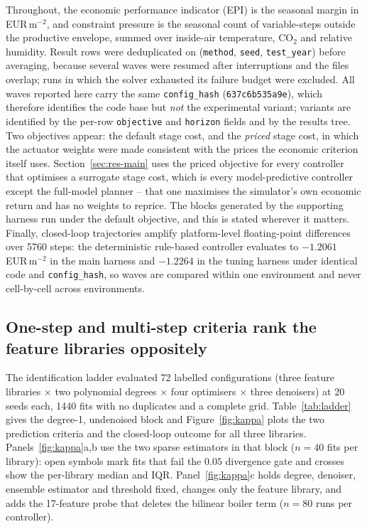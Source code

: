 Throughout, the economic performance indicator (EPI) is the seasonal margin in
EUR\,m$^{-2}$, and constraint pressure is the seasonal count of variable-steps outside the
productive envelope, summed over inside-air temperature, CO$_2$ and relative humidity. Result rows were deduplicated on
(\texttt{method}, \texttt{seed}, \texttt{test\_year}) before averaging, because several
waves were resumed after interruptions and the files overlap; runs in which the solver
exhausted its failure budget were excluded. All waves reported here carry the same
\texttt{config\_hash} (\texttt{637c6b535a9e}), which therefore identifies the code base but
\emph{not} the experimental variant; variants are identified by the per-row
\texttt{objective} and \texttt{horizon} fields and by the results tree. Two objectives
appear: the default stage cost, and the \emph{priced} stage cost, in which the actuator
weights were made consistent with the prices the economic criterion itself uses.
Section~\ref{sec:res-main} uses the priced objective for every controller that optimises a
surrogate stage cost, which is every model-predictive controller except the full-model
planner -- that one maximises the simulator's own economic return and has no weights to
reprice. The blocks generated by the supporting harness run under the default objective,
and this is stated wherever it matters. Finally, closed-loop trajectories
amplify platform-level floating-point differences over 5760 steps: the deterministic
rule-based controller evaluates to $-1.2061$ EUR\,m$^{-2}$ in the main harness and
$-1.2264$ in the tuning harness under identical code and \texttt{config\_hash}, so waves
are compared within one environment and never cell-by-cell across environments.

\subsection{One-step and multi-step criteria rank the feature libraries oppositely}
\label{sec:res-ladder}

The identification ladder evaluated 72 labelled configurations (three feature libraries
$\times$ two polynomial degrees $\times$ four optimisers $\times$ three denoisers) at 20
seeds each, 1440 fits with no duplicates and a complete grid. Table~\ref{tab:ladder}
gives the degree-1, undenoised block and Figure~\ref{fig:kappa} plots the two prediction
criteria and the closed-loop outcome for all three libraries.
Panels~\ref{fig:kappa}a,b use the two sparse estimators in that block ($n=40$ fits per
library): open symbols mark fits that fail the $0.05$ divergence gate and crosses show the
per-library median and IQR. Panel~\ref{fig:kappa}c holds degree, denoiser, ensemble
estimator and threshold fixed, changes only the feature library, and adds the 17-feature
probe that deletes the bilinear boiler term ($n=80$ runs per controller).

